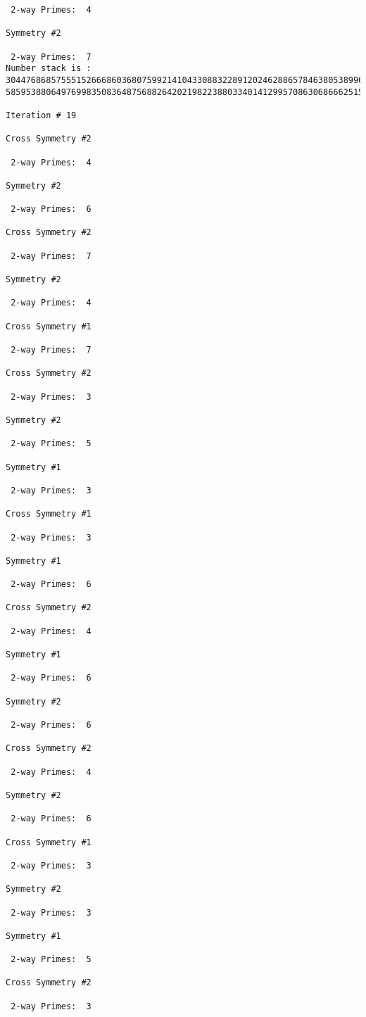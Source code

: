 \begin{verbatim}
 2-way Primes: 	4

Symmetry #2

 2-way Primes: 	7
Number stack is :
30447686857555152666860368075992141043308832289120246288657846380538996794608835958544046240163340857
58595388064976998350836487568826420219822388033401412995708630686662515557586867440375804336104264044

Iteration #	19

Cross Symmetry #2

 2-way Primes: 	4

Symmetry #2

 2-way Primes: 	6

Cross Symmetry #2

 2-way Primes: 	7

Symmetry #2

 2-way Primes: 	4

Cross Symmetry #1

 2-way Primes: 	7

Cross Symmetry #2

 2-way Primes: 	3

Symmetry #2

 2-way Primes: 	5

Symmetry #1

 2-way Primes: 	3

Cross Symmetry #1

 2-way Primes: 	3

Symmetry #1

 2-way Primes: 	6

Cross Symmetry #2

 2-way Primes: 	4

Symmetry #1

 2-way Primes: 	6

Symmetry #2

 2-way Primes: 	6

Cross Symmetry #2

 2-way Primes: 	4

Symmetry #2

 2-way Primes: 	6

Cross Symmetry #1

 2-way Primes: 	3

Symmetry #2

 2-way Primes: 	3

Symmetry #1

 2-way Primes: 	5

Cross Symmetry #2

 2-way Primes: 	3


\end{verbatim}
